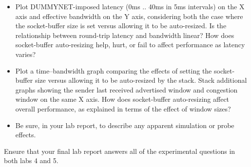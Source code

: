 \documentclass[a4paper,10pt]{article}
\begin{document}
\begin{itemize}
  \item Plot DUMMYNET-imposed latency (0ms .. 40ms in 5ms intervals) on the X
    axis and effective bandwidth on the Y axis, considering both the case
    where the socket-buffer size is set versus allowing it to be auto-resized.
    Is the relationship between round-trip latency and bandwidth linear?
    How does socket-buffer auto-resizing help, hurt, or fail to affect
    performance as latency varies?

  \item Plot a time--bandwidth graph comparing the effects of setting the
    socket-buffer size versus allowing it to be auto-resized by the stack.
    Stack additional graphs showing the sender last received advertised window
    and congestion window on the same X axis.
    How does socket-buffer auto-resizing affect overall performance, as
    explained in terms of the effect of window sizes?


  \item Be sure, in your lab report, to describe any apparent simulation or
    probe effects.
\end{itemize}

\noindent
Ensure that your final lab report answers all of the experimental questions in
both labs 4 and 5.
\end{document}
